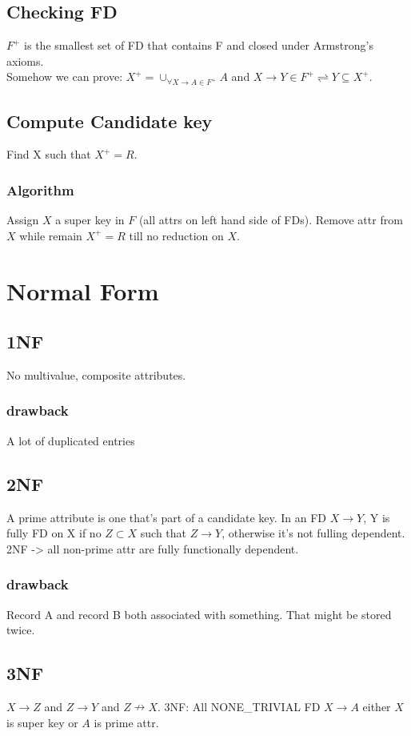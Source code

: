\documentclass[a4paper]{scrartcl}
\begin{document}
  \subsection{Checking FD}
    $F^+$ is the smallest set of FD that contains F and closed under Armstrong's axioms.\\
    Somehow we can prove: $X^+ = \cup_{\forall X \rightarrow A \in F^+}A$ and $X\rightarrow Y \in F^+ \rightleftharpoons Y \subseteq X^+$.
  \subsection{Compute Candidate key}
    Find X such that $X^+ = R$.
    \subsubsection{Algorithm}
      Assign $X$ a super key in $F$ (all attrs on left hand side of FDs). Remove attr from $X$ while remain $X^+ = R$ till no reduction on $X$.
\section{Normal Form}
  \subsection{1NF}
    No multivalue, composite attributes.
    \subsubsection{drawback}
      A lot of duplicated entries
  \subsection{2NF}
    A prime attribute is one that's part of a candidate key. In an FD $X\rightarrow Y$, Y is fully FD on X if no $Z \subset X$ such that $Z \rightarrow Y$, otherwise it's not fulling dependent. 2NF -> all non-prime attr are fully functionally dependent.
    \subsubsection{drawback}
      Record A and record B both associated with something. That might be stored twice.
  \subsection{3NF}
    $X \rightarrow Z$ and $Z \rightarrow Y$ and $Z \nrightarrow X$. 3NF: All NONE\_TRIVIAL FD $X \rightarrow A$ either $X$ is super key or $A$ is prime attr.
\end{document}
